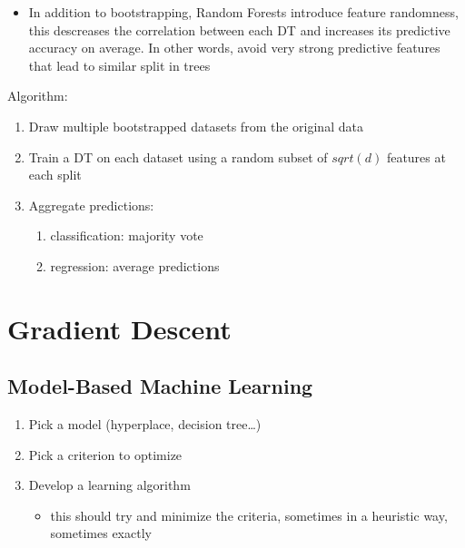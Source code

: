 \documentclass[11pt]{article}
\begin{document}
\begin{itemize}
\tightlist
\item
  In addition to bootstrapping, Random Forests introduce feature
  randomness, this descreases the correlation between each DT and
  increases its predictive accuracy on average. In other words, avoid
  very strong predictive features that lead to similar split in trees
\end{itemize}

Algorithm:

\begin{enumerate}
\def\labelenumi{\arabic{enumi}.}
\tightlist
\item
  Draw multiple bootstrapped datasets from the original data
\item
  Train a DT on each dataset using a random subset of \(sqrt(d)\)
  features at each split
\item
  Aggregate predictions:

  \begin{enumerate}
  \def\labelenumii{\arabic{enumii}.}
  \tightlist
  \item
    classification: majority vote
  \item
    regression: average predictions
  \end{enumerate}
\end{enumerate}

\section{Gradient Descent}\label{gradient-descent}

\subsection{Model-Based Machine
Learning}\label{model-based-machine-learning}

\begin{enumerate}
\def\labelenumi{\arabic{enumi}.}
\tightlist
\item
  Pick a model (hyperplace, decision tree\ldots)
\item
  Pick a criterion to optimize
\item
  Develop a learning algorithm

  \begin{itemize}
  \tightlist
  \item
    this should try and minimize the criteria, sometimes in a heuristic
    way, sometimes exactly
  \end{itemize}
\end{enumerate}
\end{document}
